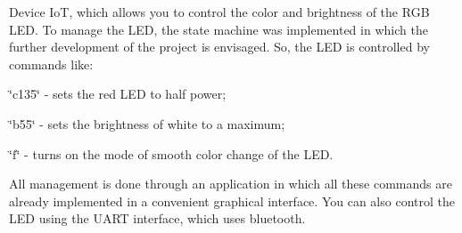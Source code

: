 Device IoT, which allows you to control the color and brightness of the R\+GB L\+ED. To manage the L\+ED, the state machine was implemented in which the further development of the project is envisaged. So, the L\+ED is controlled by commands like\+:


\begin{DoxyItemize}
\item \char`\"{}c135\char`\"{} -\/ sets the red L\+ED to half power;
\item \char`\"{}b55\char`\"{} -\/ sets the brightness of white to a maximum;
\item \char`\"{}f\char`\"{} -\/ turns on the mode of smooth color change of the L\+ED.
\end{DoxyItemize}

All management is done through an application in which all these commands are already implemented in a convenient graphical interface. You can also control the L\+ED using the U\+A\+RT interface, which uses bluetooth. 